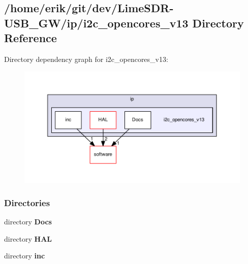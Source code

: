 \subsection{/home/erik/git/dev/\+Lime\+S\+D\+R-\/\+U\+S\+B\+\_\+\+G\+W/ip/i2c\+\_\+opencores\+\_\+v13 Directory Reference}
\label{dir_952b37c4096dba2c878758d8eb3b9a4d}
Directory dependency graph for i2c\+\_\+opencores\+\_\+v13\+:
\nopagebreak
\begin{figure}[H]
\begin{center}
\leavevmode
\includegraphics[width=350pt]{dir_952b37c4096dba2c878758d8eb3b9a4d_dep}
\end{center}
\end{figure}
\subsubsection*{Directories}
\begin{DoxyCompactItemize}
\item 
directory {\bf Docs}
\item 
directory {\bf H\+AL}
\item 
directory {\bf inc}
\end{DoxyCompactItemize}
